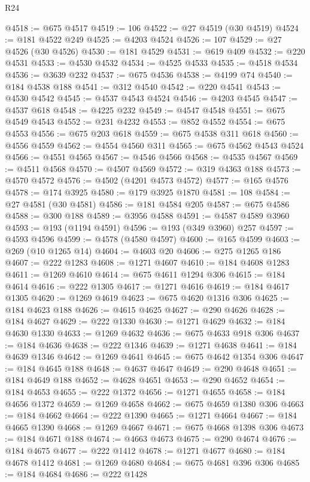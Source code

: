 \begin{lexlean}{R24}
\begin{coremodule}
@4518 := @675 @4517
@4519 := 106
@4522 := @27 @4519 (@30 @4519)
@4524 := @181 @4522 @249
@4525 := @4203 @4524
@4526 := 107
@4529 := @27 @4526 (@30 @4526)
@4530 := @181 @4529
@4531 := @619 @409
@4532 := @220 @4531
@4533 := @4530 @4532
@4534 := @4525 @4533
@4535 := @4518 @4534
@4536 := @3639 @232
@4537 := @675 @4536
@4538 := @4199 @74
@4540 := @184 @4538 @188
@4541 := @312 @4540
@4542 := @220 @4541
@4543 := @4530 @4542
@4545 := @4537 @4543 @4524
@4546 := @4203 @4545
@4547 := @4537 @618
@4548 := @4225 @232
@4549 := @4547 @4548
@4551 := @675 @4549 @4543
@4552 := @231 @4232
@4553 := @852 @4552
@4554 := @675 @4553
@4556 := @675 @203 @618
@4559 := @675 @4538 @311 @618
@4560 := @4556 @4559
@4562 := @4554 @4560 @311
@4565 := @675 @4562 @4543 @4524
@4566 := @4551 @4565
@4567 := @4546 @4566
@4568 := @4535 @4567
@4569 := @4511 @4568
@4570 := @4507 @4569
@4572 := @319 @4363 @188
@4573 := @4570 @4572
@4576 := @4502 (@4201 @4573 @4572)
@4577 := @165 @4576
@4578 := @174 @3925
@4580 := @179 @3925 @1870
@4581 := 108
@4584 := @27 @4581 (@30 @4581)
@4586 := @181 @4584 @205
@4587 := @675 @4586
@4588 := @300 @188
@4589 := @3956 @4588
@4591 := @4587 @4589 @3960
@4593 := @193 (@1194 @4591)
@4596 := @193 (@349 @3960) @257
@4597 := @4593 @4596
@4599 := @4578 (@4580 @4597)
@4600 := @165 @4599
@4603 := @269 (@10 @1265 @14)
@4604 := @4603 @20
@4606 := @275 @1265 @186
@4607 := @222 @1283
@4608 := @1271 @4607
@4610 := @184 @4608 @1283
@4611 := @1269 @4610
@4614 := @675 @4611 @1294 @306
@4615 := @184 @4614
@4616 := @222 @1305
@4617 := @1271 @4616
@4619 := @184 @4617 @1305
@4620 := @1269 @4619
@4623 := @675 @4620 @1316 @306
@4625 := @184 @4623 @188
@4626 := @4615 @4625
@4627 := @290 @4626
@4628 := @184 @4627
@4629 := @222 @1330
@4630 := @1271 @4629
@4632 := @184 @4630 @1330
@4633 := @1269 @4632
@4636 := @675 @4633 @918 @306
@4637 := @184 @4636
@4638 := @222 @1346
@4639 := @1271 @4638
@4641 := @184 @4639 @1346
@4642 := @1269 @4641
@4645 := @675 @4642 @1354 @306
@4647 := @184 @4645 @188
@4648 := @4637 @4647
@4649 := @290 @4648
@4651 := @184 @4649 @188
@4652 := @4628 @4651
@4653 := @290 @4652
@4654 := @184 @4653
@4655 := @222 @1372
@4656 := @1271 @4655
@4658 := @184 @4656 @1372
@4659 := @1269 @4658
@4662 := @675 @4659 @1380 @306
@4663 := @184 @4662
@4664 := @222 @1390
@4665 := @1271 @4664
@4667 := @184 @4665 @1390
@4668 := @1269 @4667
@4671 := @675 @4668 @1398 @306
@4673 := @184 @4671 @188
@4674 := @4663 @4673
@4675 := @290 @4674
@4676 := @184 @4675
@4677 := @222 @1412
@4678 := @1271 @4677
@4680 := @184 @4678 @1412
@4681 := @1269 @4680
@4684 := @675 @4681 @396 @306
@4685 := @184 @4684
@4686 := @222 @1428

\end{coremodule}
\end{lexlean}
